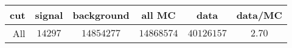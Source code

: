\begin{tabular}{r|c|c|c|c|c}
cut&signal&background&all MC&data&data/MC\\
\hline
All&$14297$&$14854277$&$14868574$&$40126157$&$2.70$\\
\end{tabular}

